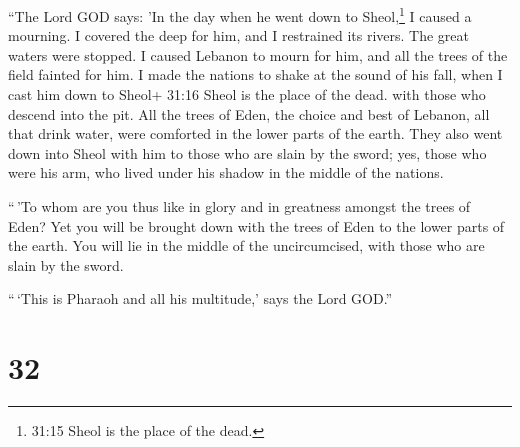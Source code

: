  ``The Lord GOD says: 'In the day when he went down to
Sheol,\footnote{31:15 Sheol is the place of the dead.} I caused a
mourning. I covered the deep for him, and I restrained its rivers. The
great waters were stopped. I caused Lebanon to mourn for him, and all
the trees of the field fainted for him.  I made the nations
to shake at the sound of his fall, when I cast him down to Sheol+ 31:16
Sheol is the place of the dead. with those who descend into the pit. All
the trees of Eden, the choice and best of Lebanon, all that drink water,
were comforted in the lower parts of the earth.  They also
went down into Sheol with him to those who are slain by the sword; yes,
those who were his arm, who lived under his shadow in the middle of the
nations.

 ``\,'To whom are you thus like in glory and in greatness
amongst the trees of Eden? Yet you will be brought down with the trees
of Eden to the lower parts of the earth. You will lie in the middle of
the uncircumcised, with those who are slain by the sword.

``\,`This is Pharaoh and all his multitude,' says the Lord GOD.''

\hypertarget{section-30}{%
\section{32}\label{section-30}}

